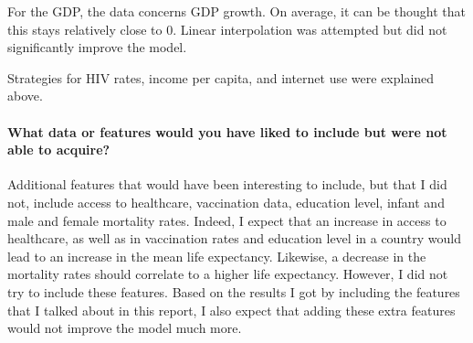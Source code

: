 \documentclass[]{article}
\let\oldparagraph\paragraph
\renewcommand{\paragraph}[1]{\oldparagraph{#1}\mbox{}}
\begin{document}
For the GDP, the data concerns GDP growth. On average, it can be thought that this stays relatively close to 0. Linear interpolation was attempted but did not significantly improve the model.

Strategies for HIV rates, income per capita, and internet use were explained above.

\paragraph{What data or features would you have liked to include but were not able to acquire?}

Additional features that would have been interesting to include, but that I did not, include access to healthcare, vaccination data, education level, infant and male and female mortality rates. Indeed, I expect that an increase in access to healthcare, as well as in vaccination rates and education level in a country would lead to an increase in the mean life expectancy. Likewise, a decrease in the mortality rates should correlate to a higher life expectancy. However, I did not try to include these features. Based on the results I got by including the features that I talked about in this report, I also expect that adding these extra features would not improve the model much more. 
\end{document}
